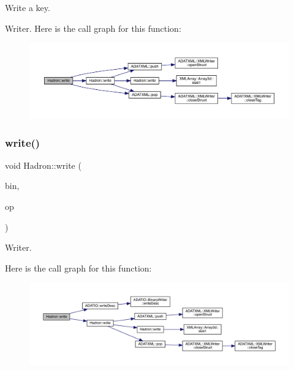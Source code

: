 Write a key. 

Writer. Here is the call graph for this function\+:
\nopagebreak
\begin{figure}[H]
\begin{center}
\leavevmode
\includegraphics[width=350pt]{d1/daf/namespaceHadron_a64d17f6dc5e4987b14cc4a2d33401b7c_cgraph}
\end{center}
\end{figure}
\mbox{\label{namespaceHadron_a36eb0d304eb3644075b1598cde742d87}} 
\subsubsection{\texorpdfstring{write()}{write()}\hspace{0.1cm}{\footnotesize\ttfamily [95/95]}}
{\footnotesize\ttfamily void Hadron\+::write (\begin{DoxyParamCaption}\item[{\mbox{\hyperlink{classADATIO_1_1BinaryWriter}{Binary\+Writer}} \&}]{bin,  }\item[{const \mbox{\hyperlink{structHadron_1_1KeySingleHadronQuarkFlavorColor__t}{Key\+Single\+Hadron\+Quark\+Flavor\+Color\+\_\+t}} \&}]{op }\end{DoxyParamCaption})}



Writer. 

Here is the call graph for this function\+:
\nopagebreak
\begin{figure}[H]
\begin{center}
\leavevmode
\includegraphics[width=350pt]{d1/daf/namespaceHadron_a36eb0d304eb3644075b1598cde742d87_cgraph}
\end{center}
\end{figure}


